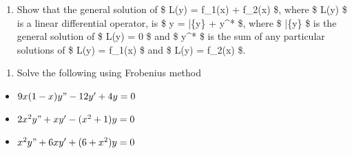 \documentclass{article}
\begin{document}
    \begin{enumerate}
\def\labelenumi{\arabic{enumi}.}
\setcounter{enumi}{6}
\tightlist
\item
  Show that the general solution of \$ L(y) = f\_1(x) + f\_2(x) \$,
  where \$ L(y) \$ is a linear differential operator, is \$ y =
  \bar\{y\} + y\^{}* \$, where \$ \bar\{y\} \$ is the general solution
  of \$ L(y) = 0 \$ and \$ y\^{}* \$ is the sum of any particular
  solutions of \$ L(y) = f\_1(x) \$ and \$ L(y) = f\_2(x) \$.
\end{enumerate}

    \begin{enumerate}
\def\labelenumi{\arabic{enumi}.}
\setcounter{enumi}{7}
\tightlist
\item
  Solve the following using Frobenius method
\end{enumerate}

\begin{itemize}
\tightlist
\item
  \(9x(1-x)y"-12y'+4y = 0\)
\item
  \(2x^2y"+xy'-(x^2+1)y = 0\)
\item
  \(x^2 y" + 6xy'+(6+x^2)y = 0\)
\end{itemize}


    
    
    
\end{document}

